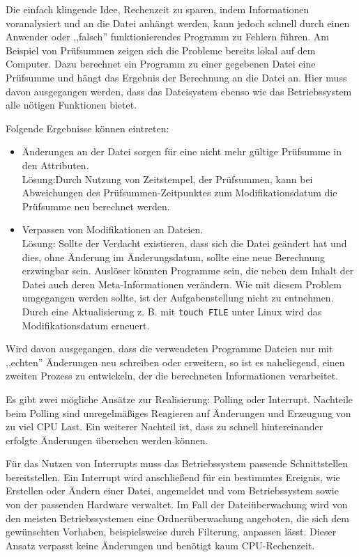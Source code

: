 \documentclass[oneside, ngerman, toc=bibliography,bibliography=totoc,listof=entryprefix, open=right,numbers=noenddot,fontsize=12pt]{scrbook}
\begin{document}
Die einfach klingende Idee, Rechenzeit zu sparen, indem Informationen voranalysiert und an die Datei anhängt werden, kann jedoch schnell durch einen Anwender oder ,,falsch'' funktionierendes Programm zu Fehlern führen. Am Beispiel von Prüfsummen zeigen sich die Probleme bereits lokal auf dem Computer. Dazu berechnet ein Programm zu einer gegebenen Datei eine Prüfsumme und hängt das Ergebnis der Berechnung an die Datei an. Hier muss davon ausgegangen werden, dass das Dateisystem ebenso wie das Betriebssystem alle nötigen Funktionen bietet.

\bigskip
Folgende Ergebnisse können eintreten:
\begin{itemize}
	\item Änderungen an der Datei sorgen für eine nicht mehr gültige Prüfsumme in den Attributen.\\
    Lösung:Durch Nutzung von Zeitstempel, der Prüfsummen, kann bei Abweichungen des Prüfsummen-Zeitpunktes zum Modifikationsdatum die Prüfsumme neu berechnet werden.
    
	\item Verpassen von Modifikationen an Dateien.\\
     Lösung: Sollte der Verdacht existieren, dass sich die Datei geändert hat und dies, ohne Änderung im Änderungsdatum, sollte eine neue Berechnung erzwingbar sein.
     Auslöser könnten Programme sein, die neben dem Inhalt der Datei auch deren Meta-Informationen verändern. Wie mit diesem Problem umgegangen werden sollte, ist der Aufgabenstellung nicht zu entnehmen. 
     Durch eine Aktualisierung z. B. mit \verb|touch FILE| unter Linux wird das Modifikationsdatum erneuert.
     
\end{itemize}

Wird davon ausgegangen, dass die verwendeten Programme Dateien nur mit ,,echten'' Änderungen neu schreiben oder erweitern, so ist es naheliegend, einen zweiten Prozess zu entwickeln, der die berechneten Informationen verarbeitet.

Es gibt zwei mögliche Ansätze zur Realisierung: {Polling} oder {Interrupt}. Nachteile beim Polling sind unregelmäßiges Reagieren auf Änderungen und Erzeugung von zu viel CPU Last. Ein weiterer Nachteil ist, dass zu schnell hintereinander erfolgte Änderungen übersehen werden können.

Für das Nutzen von {Interrupts} muss das Betriebssystem passende Schnittstellen bereitstellen. Ein {Interrupt} wird anschließend für ein bestimmtes Ereignis, wie Erstellen oder Ändern einer Datei, angemeldet und vom Betriebssystem sowie von der passenden Hardware verwaltet. Im Fall der Dateiüberwachung wird von den meisten Betriebssystemen eine Ordnerüberwachung angeboten, die sich dem gewünschten Vorhaben, beispielsweise durch Filterung, anpassen lässt. Dieser Ansatz verpasst keine Änderungen und benötigt kaum CPU-Rechenzeit.
\end{document}
